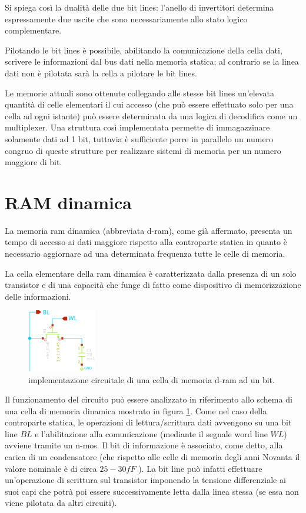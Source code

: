 	Si spiega così la dualità delle due bit lines: l'anello di invertitori determina espressamente due uscite che sono necessariamente allo stato logico complementare.
	
	Pilotando le bit lines è possibile, abilitando la comunicazione della cella dati, scrivere le informazioni dal bus dati nella memoria statica; al contrario se la linea dati non è pilotata sarà la cella a pilotare le bit lines.
	
	\vspace{5mm}
	Le memorie attuali sono ottenute collegando alle stesse bit lines un'elevata quantità di celle elementari il cui accesso (che può essere effettuato solo per una cella ad ogni istante) può essere determinata da una logica di decodifica come un multiplexer. Una struttura così implementata permette di immagazzinare solamente dati ad 1 bit, tuttavia è sufficiente porre in parallelo un numero congruo di queste strutture per realizzare sistemi di memoria per un numero maggiore di bit.
	
\section{RAM dinamica}	
	La memoria ram dinamica (abbreviata d-ram), come già affermato, presenta un tempo di accesso ai dati maggiore rispetto alla controparte statica in quanto è necessario aggiornare ad una determinata frequenza tutte le celle di memoria.
	
	La cella elementare della ram dinamica è caratterizzata dalla presenza di un solo transistor e di una capacità che funge di fatto come dispositivo di memorizzazione delle informazioni.
	
	\begin{figure}[bht]
		\centering
		\includegraphics[width=3cm]{Immagini/dram-sch}
		\caption{implementazione circuitale di una cella di memoria d-ram ad un bit.}
		\label{fig:dram:sch}
	\end{figure}

	Il funzionamento del circuito può essere analizzato in riferimento allo schema di una cella di memoria dinamica mostrato in figura \ref{fig:dram:sch}. Come nel caso della controparte statica, le operazioni di lettura/scrittura dati avvengono su una bit line $BL$ e l'abilitazione alla comunicazione (mediante il segnale word line $WL$) avviene tramite un n-mos. Il bit di informazione è associato, come detto, alla carica di un condensatore (che rispetto alle celle di memoria degli anni Novanta il valore nominale è di circa $25-30fF$ \cite{raminfo}). La bit line può infatti effettuare un'operazione di scrittura sul transistor imponendo la tensione differenziale ai suoi capi che potrà poi essere successivamente letta dalla linea stessa (se essa non viene pilotata da altri circuiti).
	
